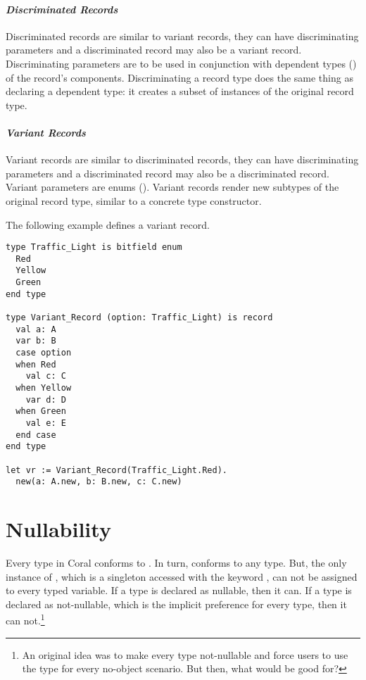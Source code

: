 \paragraph{\em Discriminated Records}
Discriminated records are similar to variant records, they can have discriminating parameters and a discriminated record may also be a variant record. Discriminating parameters are to be used in conjunction with dependent types () of the record's components. Discriminating a record type does the same thing as declaring a dependent type: it creates a subset of instances of the original record type. 

\paragraph{\em Variant Records}
Variant records are similar to discriminated records, they can have discriminating parameters and a discriminated record may also be a discriminated record. Variant parameters are enums (). Variant records render new subtypes of the original record type, similar to a concrete type constructor.

\example The following example defines a variant record. 
\begin{lstlisting}
type Traffic_Light is bitfield enum
  Red
  Yellow
  Green
end type

type Variant_Record (option: Traffic_Light) is record
  val a: A
  var b: B
  case option
  when Red
    val c: C
  when Yellow
    var d: D
  when Green
    val e: E
  end case
end type

let vr := Variant_Record(Traffic_Light.Red).
  new(a: A.new, b: B.new, c: C.new)
\end{lstlisting}

\section{Nullability}
\label{sec:nullability}

Every type in Coral conforms to . In turn,  conforms to any type. But, the only instance of , which is a singleton accessed with the keyword , can not be assigned to every typed variable. If a type is declared as nullable, then it can. If a type is declared as not-nullable, which is the implicit preference for every type, then it can not.\footnote{An original idea was to make every type not-nullable and force users to use the  type for every no-object scenario. But then, what would  be good for?}

